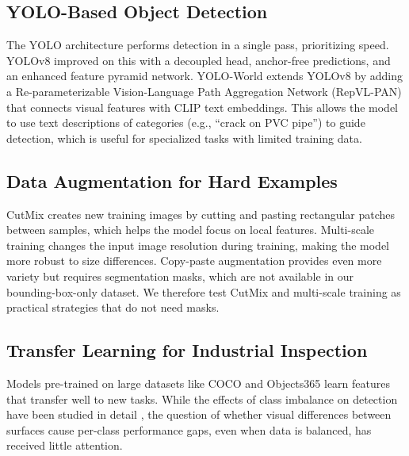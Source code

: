 \documentclass[conference]{IEEEtran}
\begin{document}
\subsection{YOLO-Based Object Detection}

The YOLO architecture \cite{redmon2016yolo} performs detection in a single pass, prioritizing speed. YOLOv8 \cite{jocher2023ultralytics} improved on this with a decoupled head, anchor-free predictions, and an enhanced feature pyramid network. YOLO-World \cite{cheng2024yoloworld} extends YOLOv8 by adding a Re-parameterizable Vision-Language Path Aggregation Network (RepVL-PAN) that connects visual features with CLIP \cite{radford2021clip} text embeddings. This allows the model to use text descriptions of categories (e.g., ``crack on PVC pipe'') to guide detection, which is useful for specialized tasks with limited training data.

\subsection{Data Augmentation for Hard Examples}

CutMix \cite{yun2019cutmix} creates new training images by cutting and pasting rectangular patches between samples, which helps the model focus on local features. Multi-scale training changes the input image resolution during training, making the model more robust to size differences. Copy-paste augmentation \cite{ghiasi2021copypaste} provides even more variety but requires segmentation masks, which are not available in our bounding-box-only dataset. We therefore test CutMix and multi-scale training as practical strategies that do not need masks.

\subsection{Transfer Learning for Industrial Inspection}

Models pre-trained on large datasets like COCO \cite{lin2014coco} and Objects365 \cite{shao2019objects365} learn features that transfer well to new tasks. While the effects of class imbalance on detection have been studied in detail \cite{japkowicz2023class,oksuz2021imbalance}, the question of whether visual differences between surfaces cause per-class performance gaps, even when data is balanced, has received little attention.

\end{document}
